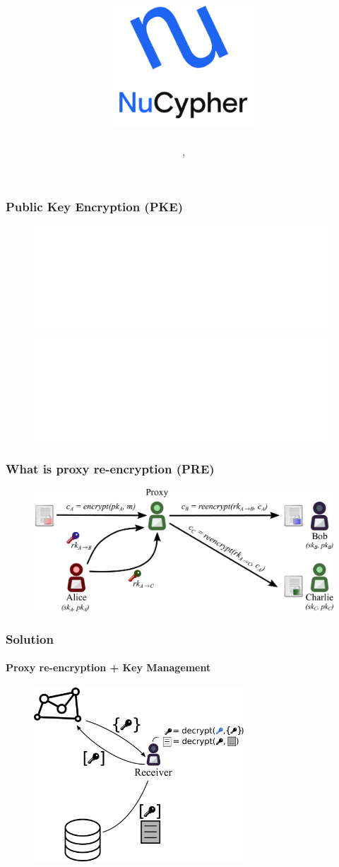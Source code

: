 \documentclass[xetex,mathsans,sans,aspectratio=169]{beamer}
\title[\titlefooter]{\includegraphics[width=5.5cm]{pdf/nucypher_logo.pdf}}
\author[\presenterfooter]{\presenter}
\date[\eventdate]{\event, \eventdate}
\begin{document}
    \begin{frame}
        \titlepage
    \end{frame}

    \begin{frame}
        \frametitle{Public Key Encryption (PKE)}
        \begin{figure}
            \centering
            \includegraphics<1>[width=11cm]{pdf/pke-multi.pdf}
            \includegraphics<2>[width=11cm]{pdf/pke-multi-hack.pdf}
        \end{figure}
    \end{frame}

    \begin{frame}
        \frametitle{What is proxy re-encryption (PRE)}
        \begin{figure}
            \centering
            \includegraphics[width=13cm]{pdf/pre-multi.pdf}
        \end{figure}
    \end{frame}

    \begin{frame}
        \frametitle{Solution}
        \framesubtitle{Proxy re-encryption + Key Management}
        \begin{figure}
            \centering
            \includegraphics[height=6.5cm]{pdf/pre-kms.pdf}
        \end{figure}
    \end{frame}
\end{document}
